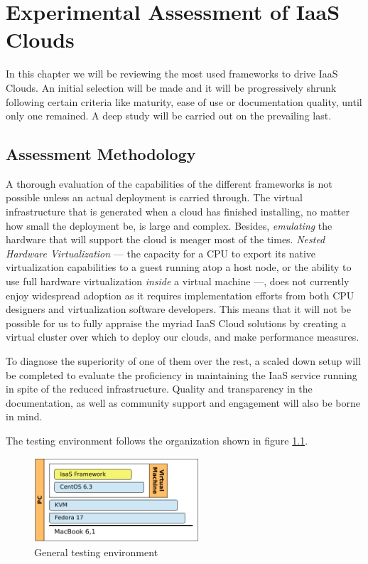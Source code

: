 \chapter{Experimental Assessment of IaaS Clouds}\label{cap:evaliaas}
\noindent In this chapter we will be reviewing the most used frameworks to drive IaaS Clouds. An initial selection will be made and it will be progressively shrunk following certain criteria like maturity, ease of use or documentation quality, until only one remained. A deep study will be carried out on the prevailing last.

\section{Assessment Methodology}\label{sec:evaluacion}
\noindent A thorough evaluation of the capabilities of the different frameworks is not possible unless an actual deployment is carried through. The virtual infrastructure that is generated when a cloud has finished installing, no matter how small the deployment be, is large and complex. Besides, \emph{emulating} the hardware that will support the cloud is meager most of the times. \emph{Nested Hardware Virtualization} --- the capacity for a CPU to export its native virtualization capabilities to a guest running atop a host node, or the ability to use full hardware virtualization \emph{inside} a virtual machine ---, does not currently enjoy widespread adoption as it requires implementation efforts from both CPU designers and virtualization software developers. This means that it will not be possible for us to fully appraise the myriad IaaS Cloud solutions by creating a virtual cluster over which to deploy our clouds, and make performance measures.

To diagnose the superiority of one of them over the rest, a scaled down setup will be completed to evaluate the proficiency in maintaining the IaaS service running in spite of the reduced infrastructure. Quality and transparency in the documentation, as well as community support and engagement will also be borne in mind.

The testing environment follows the organization shown in figure \ref{fig:espacioprueba}.

\begin{figure}[tbp]
\begin{center}
\includegraphics[width=0.55\textwidth]{imagenes/007.pdf}
 \caption{General testing environment}
\label{fig:espacioprueba}
\end{center}
\end{figure}

